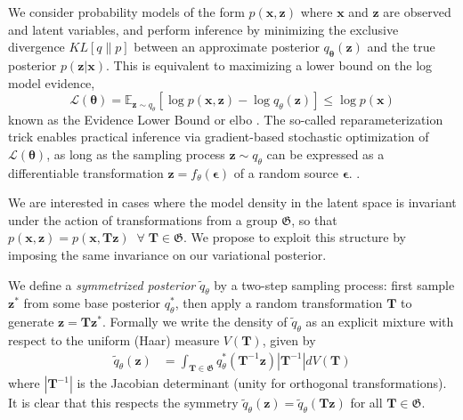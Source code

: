 \documentclass{article}
\newcommand{\E}{\mathbb{E}}
\newcommand{\G}{\mathfrak{G}}
\renewcommand{\v}[1]{\mathbf{#1}}
\newcommand{\elbo}{{\sc elbo}}
\begin{document}
We consider probability models of the form $p(\v{x}, \v{z})$ where $\v{x}$ and
$\v{z}$ are observed and latent variables, and perform
inference by minimizing the exclusive divergence $KL[q \| p]$
between an approximate posterior $q_{\v{\theta}}(\v{z})$ and the true
posterior $p(\v{z}|\v{x})$. This is equivalent to maximizing a lower
bound on the log model evidence,
\begin{equation}
\mathcal{L}(\v{\theta})\label{eqn:elbo} = \E_{\v{z}\sim q_\theta}\left[\log p(\v{x}, \v{z}) -
                \log q_\theta(\v{z})\right] \le \log p(\v{x}) 
\end{equation}
known as the Evidence Lower Bound or \elbo \; \citep{bishop2006pattern}. 
The so-called reparameterization trick enables practical inference via
gradient-based stochastic optimization of $\mathcal{L}(\v{\theta})$, as
long as the sampling process $\v{z}\sim q_\theta$ can be expressed as
a differentiable transformation $\v{z} = f_\theta(\v{\epsilon})$ of a random
source $\v{\epsilon}$. \citep{kingma2013auto, kucukelbir2016automatic}. 

We are interested in cases where the model density in the latent space is invariant under
the action of transformations from a group $\G$, so that 
$p(\v{x}, \v{z}) = p(\v{x}, \v{T}\v{z}) \;\; \forall \; \v{T} \in
\G.$
We propose to exploit this structure by imposing the same invariance
on our variational posterior. 

We define a {\em symmetrized
  posterior} $\tilde{q}_{\theta}$ by a two-step sampling
process: first sample $\v{z}^*$ from some base posterior $q_\theta^*$, then apply a random
transformation $\v{T}$ to generate $\v{z} =
\v{T}\v{z}^*$. Formally we write the density of $\tilde{q}_{\theta}$ as an
explicit mixture with respect to the uniform (Haar) measure $V(\v{T})$,
given by
\begin{align}
\tilde{q}_{\theta}(\v{z}) &= \int_{\v{T}\in \G}
                            q^*_{\theta}(\v{T}^{-1}\v{z})
                            \left|\v{T}^{-1}\right|dV(\v{T})
\end{align}
where $\left|\v{T}^{-1}\right|$ is the Jacobian
determinant (unity for orthogonal transformations). It is clear that this
respects the symmetry $\tilde{q}_\theta(\v{z})
=\tilde{q}_\theta(\v{T}\v{z})$ for all $\v{T}\in\G$. 
\end{document}
